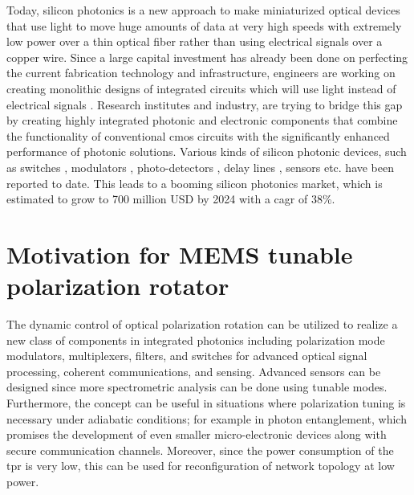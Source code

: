 \documentclass[../report.tex]{subfiles}
\begin{document}
Today, silicon photonics is a new approach to make miniaturized optical devices that use light to move huge amounts of data at very high speeds with extremely low power over a thin optical fiber rather than using electrical signals over a copper wire. Since a large capital investment has already been done on perfecting the current fabrication technology and infrastructure, engineers are working on creating monolithic designs of integrated circuits which will use light instead of electrical signals \cite{optical_linking}. Research institutes and industry, are trying to bridge this gap by creating highly integrated photonic and electronic components that combine the functionality of conventional \gls{cmos} circuits with the significantly enhanced performance of photonic solutions. Various kinds of silicon photonic devices, such as switches \cite{stabile_integrated_2016,wu_mems-enabled_2015,nikolova_scaling_2015,lu_low-power_2014}, modulators \cite{dong_silicon_2015,chen_generation_2013}, photo-detectors \cite{urino_demonstration_2012,chang_high-power_2015}, delay lines \cite{garcia_design_2015,mattarei_variable_2014}, sensors \cite{janz_silicon_2007,lim_laser_2010,ryckeboer_glucose_2014} etc. have been reported to date. This leads to a booming silicon photonics market, which is estimated to grow to 700 million USD by 2024 \cite{jalali_silicon_2006,silicon_photonics_growth_2015} with a \gls{cagr} of 38\%.

	\section{Motivation for MEMS tunable polarization rotator} 
The dynamic control of optical polarization rotation can be utilized to realize a new class of components in integrated photonics including polarization mode modulators, multiplexers, filters, and switches for advanced optical signal processing, coherent communications, and sensing. Advanced sensors can be designed since more spectrometric analysis can be done using tunable modes. Furthermore, the concept can be useful in situations where polarization tuning is necessary under adiabatic conditions; for example in photon entanglement, which promises the development of even smaller micro-electronic devices along with secure communication channels. Moreover, since the power consumption of the \gls{tpr} is very low, this can be used for reconfiguration of network topology at low power. \par
\end{document}
